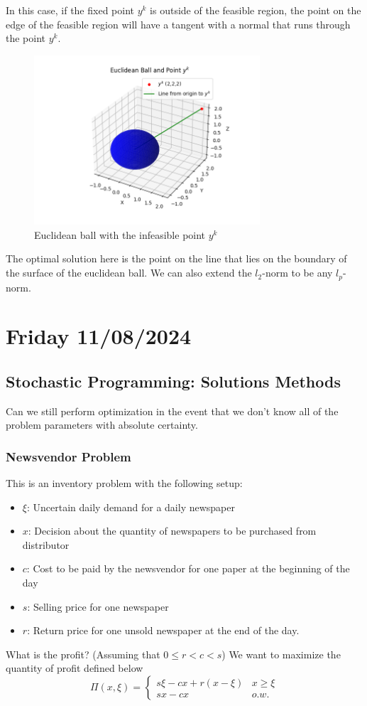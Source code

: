 In this case, if the fixed point $y^k$ is outside of the feasible region, the point on the edge of the feasible region will have a tangent with a normal that runs through the point $y^k$.
\begin{figure}[htbp]
  \centerline{\includegraphics[width=0.75\textwidth]{images/euclidean_ball.png}}
  \caption{Euclidean ball with the infeasible point $y^k$}
  \label{fig:euclidean_ball}
\end{figure}

The optimal solution here is the point on the line that lies on the boundary of the surface of the euclidean ball.
We can also extend the $l_2$-norm to be any $l_p$-norm.

\section{Friday 11/08/2024}
\subsection{Stochastic Programming: Solutions Methods}
Can we still perform optimization in the event that we don't know all of the problem parameters with absolute certainty.
\subsubsection{Newsvendor Problem}
This is an inventory problem with the following setup:
\begin{itemize}
  \item $\xi$: Uncertain daily demand for a daily newspaper
  \item $x$: Decision about the quantity of newspapers to be purchased from distributor
  \item $c$: Cost to be paid by the newsvendor for one paper at the beginning of the day
  \item $s$: Selling price for one newspaper
  \item $r$: Return price for one unsold newspaper at the end of the day.
\end{itemize} 
What is the profit? (Assuming that $0\leq r < c < s$)
We want to maximize the quantity of profit defined below
\begin{equation}
  \Pi(x,\xi) = 
  \begin{cases}
    s\xi - cx + r(x-\xi) & x \geq \xi \\
    sx -cx & o.w.
  \end{cases}
\end{equation}


